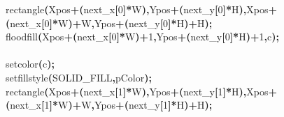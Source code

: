 \documentclass[a4paper, 10pt]{article}
\newcommand\SPC{\hspace*{0.6em}}
\newcommand{\CppAIdentifier}[1]{#1}
\newcommand{\CppANumber}[1]{\textcolor[rgb]{0.5,0,0.5}{#1}}
\newcommand{\CppASpace}[1]{\colorbox[rgb]{1,1,1}{#1}}
\newcommand{\CppASymbol}[1]{\textbf{\textcolor[rgb]{1,0,0}{#1}}}
\begin{document}
\begin{ttfamily}
\CppASpace{\SPC }\CppAIdentifier{rectangle}\CppASymbol{(}\CppAIdentifier{Xpos}\CppASymbol{+}\CppASymbol{(}\CppAIdentifier{next\_x}\CppASymbol{[}\CppANumber{0}\CppASymbol{]}\CppASymbol{*}\CppAIdentifier{W}\CppASymbol{)}\CppASymbol{,}\CppAIdentifier{Ypos}\CppASymbol{+}\CppASymbol{(}\CppAIdentifier{next\_y}\CppASymbol{[}\CppANumber{0}\CppASymbol{]}\CppASymbol{*}\CppAIdentifier{H}\CppASymbol{)}\CppASymbol{,}\CppAIdentifier{Xpos}\CppASymbol{+}\CppASymbol{(}\CppAIdentifier{next\_x}\CppASymbol{[}\CppANumber{0}\CppASymbol{]}\CppASymbol{*}\CppAIdentifier{W}\CppASymbol{)}\CppASymbol{+}\CppAIdentifier{W}\CppASymbol{,}\CppAIdentifier{Ypos}\CppASymbol{+}\CppASymbol{(}\CppAIdentifier{next\_y}\CppASymbol{[}\CppANumber{0}\CppASymbol{]}\CppASymbol{*}\CppAIdentifier{H}\CppASymbol{)}\CppASymbol{+}\CppAIdentifier{H}\CppASymbol{)}\CppASymbol{;}\\
\CppASpace{\SPC }\CppAIdentifier{floodfill}\CppASymbol{(}\CppAIdentifier{Xpos}\CppASymbol{+}\CppASymbol{(}\CppAIdentifier{next\_x}\CppASymbol{[}\CppANumber{0}\CppASymbol{]}\CppASymbol{*}\CppAIdentifier{W}\CppASymbol{)}\CppASymbol{+}\CppANumber{1}\CppASymbol{,}\CppAIdentifier{Ypos}\CppASymbol{+}\CppASymbol{(}\CppAIdentifier{next\_y}\CppASymbol{[}\CppANumber{0}\CppASymbol{]}\CppASymbol{*}\CppAIdentifier{H}\CppASymbol{)}\CppASymbol{+}\CppANumber{1}\CppASymbol{,}\CppAIdentifier{c}\CppASymbol{)}\CppASymbol{;}\\
\\
\CppASpace{\SPC }\CppAIdentifier{setcolor}\CppASymbol{(}\CppAIdentifier{c}\CppASymbol{)}\CppASymbol{;}\\
\CppASpace{\SPC }\CppAIdentifier{setfillstyle}\CppASymbol{(}\CppAIdentifier{SOLID\_FILL}\CppASymbol{,}\CppAIdentifier{pColor}\CppASymbol{)}\CppASymbol{;}\\
\CppASpace{\SPC }\CppAIdentifier{rectangle}\CppASymbol{(}\CppAIdentifier{Xpos}\CppASymbol{+}\CppASymbol{(}\CppAIdentifier{next\_x}\CppASymbol{[}\CppANumber{1}\CppASymbol{]}\CppASymbol{*}\CppAIdentifier{W}\CppASymbol{)}\CppASymbol{,}\CppAIdentifier{Ypos}\CppASymbol{+}\CppASymbol{(}\CppAIdentifier{next\_y}\CppASymbol{[}\CppANumber{1}\CppASymbol{]}\CppASymbol{*}\CppAIdentifier{H}\CppASymbol{)}\CppASymbol{,}\CppAIdentifier{Xpos}\CppASymbol{+}\CppASymbol{(}\CppAIdentifier{next\_x}\CppASymbol{[}\CppANumber{1}\CppASymbol{]}\CppASymbol{*}\CppAIdentifier{W}\CppASymbol{)}\CppASymbol{+}\CppAIdentifier{W}\CppASymbol{,}\CppAIdentifier{Ypos}\CppASymbol{+}\CppASymbol{(}\CppAIdentifier{next\_y}\CppASymbol{[}\CppANumber{1}\CppASymbol{]}\CppASymbol{*}\CppAIdentifier{H}\CppASymbol{)}\CppASymbol{+}\CppAIdentifier{H}\CppASymbol{)}\CppASymbol{;}\\

\end{ttfamily}
\end{document}
